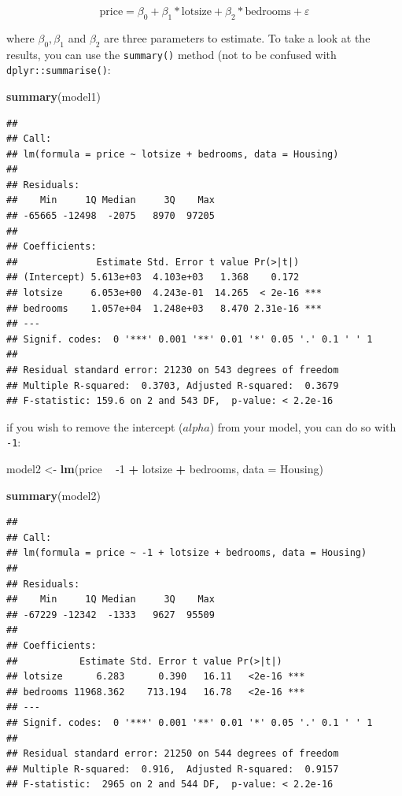 \documentclass[]{gitbook}
\newenvironment{Shaded}{\begin{snugshade}}{\end{snugshade}}
\newcommand{\DataTypeTok}[1]{\textcolor[rgb]{0.13,0.29,0.53}{#1}}
\newcommand{\DecValTok}[1]{\textcolor[rgb]{0.00,0.00,0.81}{#1}}
\newcommand{\KeywordTok}[1]{\textcolor[rgb]{0.13,0.29,0.53}{\textbf{#1}}}
\newcommand{\NormalTok}[1]{#1}
\newcommand{\OperatorTok}[1]{\textcolor[rgb]{0.81,0.36,0.00}{\textbf{#1}}}
\newcommand{\StringTok}[1]{\textcolor[rgb]{0.31,0.60,0.02}{#1}}
\begin{document}
\[
\text{price} = \beta_0 + \beta_1 * \text{lotsize} + \beta_2 * \text{bedrooms} + \varepsilon
\]

where \(\beta_0, \beta_1\) and \(\beta_2\) are three parameters to estimate. To take a look at the
results, you can use the \texttt{summary()} method (not to be confused with \texttt{dplyr::summarise()}:

\begin{Shaded}
\begin{Highlighting}[]
\KeywordTok{summary}\NormalTok{(model1)}
\end{Highlighting}
\end{Shaded}

\begin{verbatim}
## 
## Call:
## lm(formula = price ~ lotsize + bedrooms, data = Housing)
## 
## Residuals:
##    Min     1Q Median     3Q    Max 
## -65665 -12498  -2075   8970  97205 
## 
## Coefficients:
##              Estimate Std. Error t value Pr(>|t|)    
## (Intercept) 5.613e+03  4.103e+03   1.368    0.172    
## lotsize     6.053e+00  4.243e-01  14.265  < 2e-16 ***
## bedrooms    1.057e+04  1.248e+03   8.470 2.31e-16 ***
## ---
## Signif. codes:  0 '***' 0.001 '**' 0.01 '*' 0.05 '.' 0.1 ' ' 1
## 
## Residual standard error: 21230 on 543 degrees of freedom
## Multiple R-squared:  0.3703, Adjusted R-squared:  0.3679 
## F-statistic: 159.6 on 2 and 543 DF,  p-value: < 2.2e-16
\end{verbatim}

if you wish to remove the intercept (\(alpha\)) from your model, you can do so with \texttt{-1}:

\begin{Shaded}
\begin{Highlighting}[]
\NormalTok{model2 <-}\StringTok{ }\KeywordTok{lm}\NormalTok{(price }\OperatorTok{~}\StringTok{ }\DecValTok{-1} \OperatorTok{+}\StringTok{ }\NormalTok{lotsize }\OperatorTok{+}\StringTok{ }\NormalTok{bedrooms, }\DataTypeTok{data =}\NormalTok{ Housing)}

\KeywordTok{summary}\NormalTok{(model2)}
\end{Highlighting}
\end{Shaded}

\begin{verbatim}
## 
## Call:
## lm(formula = price ~ -1 + lotsize + bedrooms, data = Housing)
## 
## Residuals:
##    Min     1Q Median     3Q    Max 
## -67229 -12342  -1333   9627  95509 
## 
## Coefficients:
##           Estimate Std. Error t value Pr(>|t|)    
## lotsize      6.283      0.390   16.11   <2e-16 ***
## bedrooms 11968.362    713.194   16.78   <2e-16 ***
## ---
## Signif. codes:  0 '***' 0.001 '**' 0.01 '*' 0.05 '.' 0.1 ' ' 1
## 
## Residual standard error: 21250 on 544 degrees of freedom
## Multiple R-squared:  0.916,  Adjusted R-squared:  0.9157 
## F-statistic:  2965 on 2 and 544 DF,  p-value: < 2.2e-16
\end{verbatim}
\end{document}
